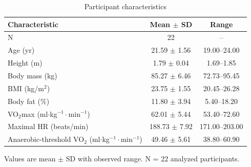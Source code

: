 \begin{table}[htbp]
\centering
\begin{threeparttable}
\begin{tabular}{lcc}
\toprule
Characteristic & Mean $\pm$ SD & Range \\
\midrule
N & 22 & -- \\
Age (yr) & 21.59 $\pm$ 1.56 & 19.00--24.00 \\
Height (m) & 1.79 $\pm$ 0.04 & 1.69--1.85 \\
Body mass (kg) & 85.27 $\pm$ 6.46 & 72.73--95.45 \\
BMI (kg/m$^2$) & 23.75 $\pm$ 1.55 & 20.45--26.28 \\
Body fat (\%) & 11.80 $\pm$ 3.94 & 5.40--18.20 \\
VO$_2$max (ml$\cdot$kg$^{-1}\cdot$min$^{-1}$) & 62.01 $\pm$ 5.44 & 53.40--72.60 \\
Maximal HR (beats/min) & 188.73 $\pm$ 7.92 & 171.00--203.00 \\
Anaerobic-threshold VO$_2$ (ml$\cdot$kg$^{-1}\cdot$min$^{-1}$) & 49.46 $\pm$ 5.61 & 38.80--60.90 \\
\bottomrule
\end{tabular}\begin{tablenotes}\footnotesize\item Values are mean $\pm$ SD with observed range. N = 22 analyzed participants.\end{tablenotes}
\end{threeparttable}
\caption{Participant characteristics}
\label{tab:participant-characteristics}
\end{table}
